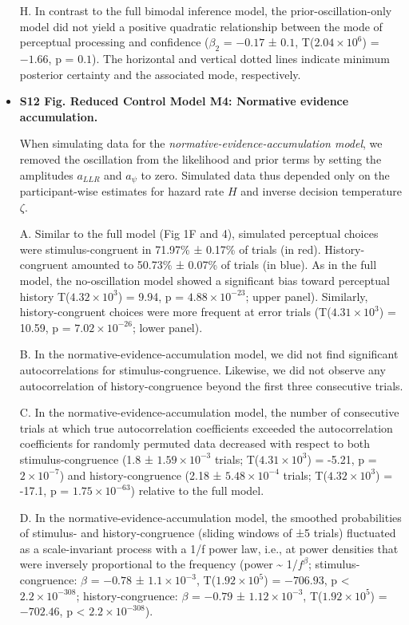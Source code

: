 \documentclass[
]{article}
\begin{document}
\begin{itemize}
H. In contrast to the full bimodal inference model, the
prior-oscillation-only model did not yield a positive quadratic
relationship between the mode of perceptual processing and confidence
(\(\beta_2\) = \(-0.17\) ± \(0.1\),
T(\(\ensuremath{2.04\times 10^{6}}\)) = \(-1.66\), p = \(0.1\)). The
horizontal and vertical dotted lines indicate minimum posterior
certainty and the associated mode, respectively.

\item \textbf{S12 Fig. Reduced Control Model M4: Normative evidence accumulation.}

When simulating data for the
\emph{normative-evidence-accumulation model}, we removed the oscillation
from the likelihood and prior terms by setting the amplitudes
\(a_{LLR}\) and \(a_{\psi}\) to zero. Simulated data thus depended only
on the participant-wise estimates for hazard rate \(H\) and inverse
decision temperature \(\zeta\).

A. Similar to the full model (Fig 1F and 4), simulated
perceptual choices were stimulus-congruent in 71.97\% ± 0.17\% of trials
(in red). History-congruent amounted to 50.73\% ± 0.07\% of trials (in
blue). As in the full model, the no-oscillation model showed a
significant bias toward perceptual history
T(\ensuremath{4.32\times 10^{3}}) = 9.94, p =
\(\ensuremath{4.88\times 10^{-23}}\); upper panel). Similarly,
history-congruent choices were more frequent at error trials
(T(\ensuremath{4.31\times 10^{3}}) = 10.59, p =
\(\ensuremath{7.02\times 10^{-26}}\); lower panel).

B. In the normative-evidence-accumulation model, we did not find
significant autocorrelations for stimulus-congruence. Likewise, we did
not observe any autocorrelation of history-congruence beyond the first
three consecutive trials.

C. In the normative-evidence-accumulation model, the number of
consecutive trials at which true autocorrelation coefficients exceeded
the autocorrelation coefficients for randomly permuted data decreased
with respect to both stimulus-congruence (1.8 ±
\ensuremath{1.59\times 10^{-3}} trials;
T(\ensuremath{4.31\times 10^{3}}) = -5.21, p =
\(\ensuremath{2\times 10^{-7}}\)) and history-congruence (2.18 ±
\ensuremath{5.48\times 10^{-4}} trials;
T(\ensuremath{4.32\times 10^{3}}) = -17.1, p =
\(\ensuremath{1.75\times 10^{-63}}\)) relative to the full model.

D. In the normative-evidence-accumulation model, the smoothed
probabilities of stimulus- and history-congruence (sliding windows of ±5
trials) fluctuated as a scale-invariant process with a 1/f power law,
i.e., at power densities that were inversely proportional to the
frequency (power \textasciitilde{} 1/\(f^\beta\); stimulus-congruence:
\(\beta\) = \(-0.78\) ± \(\ensuremath{1.1\times 10^{-3}}\),
T(\(\ensuremath{1.92\times 10^{5}}\)) = \(-706.93\), p < \(\ensuremath{2.2\times 10^{-308}}\);
history-congruence: \(\beta\) = \(-0.79\) ±
\(\ensuremath{1.12\times 10^{-3}}\),
T(\(\ensuremath{1.92\times 10^{5}}\)) = \(-702.46\), p < \(\ensuremath{2.2\times 10^{-308}}\)).


\end{itemize}
\end{document}

